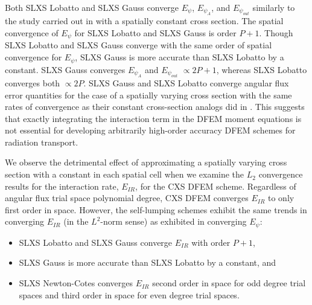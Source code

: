 Both SLXS Lobatto and SLXS Gauss converge $E_{\psi}$, $E_{\psi_A}$, and $E_{\psi_{out}}$ similarly to the study carried out in \cite{part_1_paper} with a spatially constant cross section.
The spatial convergence of $E_{\psi}$ for SLXS Lobatto and SLXS Gauss is order $P+1$.
Though SLXS Lobatto and SLXS Gauss converge with the same order of spatial convergence for $E_{\psi}$, SLXS Gauss is more accurate than SLXS Lobatto by a constant.  
SLXS Gauss converges $E_{\psi_A}$ and $E_{\psi_{out}}$ $\propto 2P+1$, whereas SLXS Lobatto converges both $\propto 2P$.
SLXS Gauss and SLXS Lobatto converge angular flux error quantities for the case of a spatially varying cross section with the same rates of convergence as their constant cross-section analogs did in \cite{part_1_paper}.
This suggests that exactly integrating the interaction term in the DFEM moment equations is not essential for developing arbitrarily high-order accuracy DFEM schemes for radiation transport.

We observe the detrimental effect of approximating a spatially varying cross section with a constant in each spatial cell when we examine the $L_2$ convergence results for the interaction rate, $E_{IR}$, for the CXS DFEM scheme.
Regardless of angular flux trial space polynomial degree, CXS DFEM converges $E_{IR}$ to only first order in space.
However, the self-lumping schemes exhibit the same trends in converging $E_{IR}$ (in the $L^2$-norm sense) as exhibited in converging $E_{\psi}$:
\begin{itemize}
\item SLXS Lobatto and SLXS Gauss converge $E_{IR}$ with order $P+1$,
\item SLXS Gauss is more accurate than SLXS Lobatto by a constant, and
\item SLXS Newton-Cotes converges $E_{IR}$ second order in space for odd degree trial spaces and third order in space for even degree trial spaces.
\end{itemize}  

